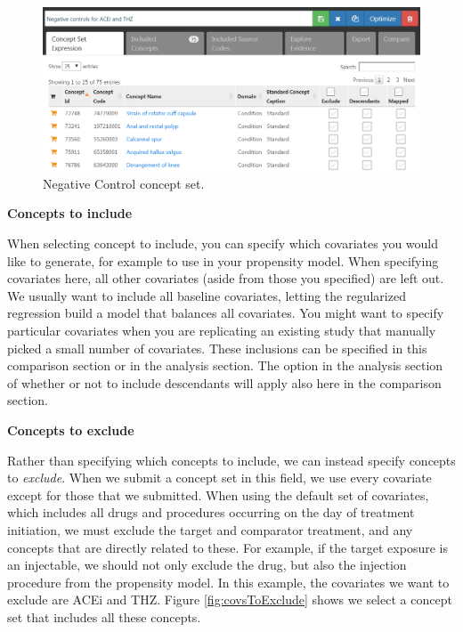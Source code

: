 \documentclass[]{book}
\begin{document}
\begin{figure}

{\centering \includegraphics[width=1\linewidth]{images/PopulationLevelEstimation/ncConceptSet} 

}

\caption{Negative Control concept set.}\label{fig:ncConceptSet}
\end{figure}

\textbf{Concepts to include}

When selecting concept to include, you can specify which covariates you
would like to generate, for example to use in your propensity model.
When specifying covariates here, all other covariates (aside from those
you specified) are left out. We usually want to include all baseline
covariates, letting the regularized regression build a model that
balances all covariates. You might want to specify particular covariates
when you are replicating an existing study that manually picked a small
number of covariates. These inclusions can be specified in this
comparison section or in the analysis section. The option in the
analysis section of whether or not to include descendants will apply
also here in the comparison section.

\textbf{Concepts to exclude}

Rather than specifying which concepts to include, we can instead specify
concepts to \emph{exclude}. When we submit a concept set in this field,
we use every covariate except for those that we submitted. When using
the default set of covariates, which includes all drugs and procedures
occurring on the day of treatment initiation, we must exclude the target
and comparator treatment, and any concepts that are directly related to
these. For example, if the target exposure is an injectable, we should
not only exclude the drug, but also the injection procedure from the
propensity model. In this example, the covariates we want to exclude are
ACEi and THZ. Figure \ref{fig:covsToExclude} shows we select a concept
set that includes all these concepts.
\end{document}
